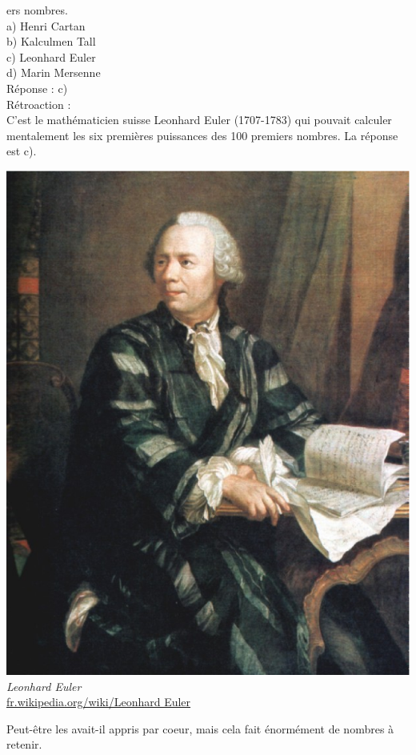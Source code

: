 \documentclass[letterpaper, 12pt]{article}
\begin{document}
ers nombres.\\

a) Henri Cartan\\
b) Kalculmen Tall\\
c) Leonhard Euler\\
d) Marin Mersenne\\

R\'eponse : c)\\

R\'etroaction :\\
C'est le math\'ematicien suisse Leonhard Euler (1707-1783) qui pouvait calculer mentalement les six premi\`eres puissances des 100 premiers nombres. La r\'eponse est c).
\begin{center}
\includegraphics[scale=0.15]{Euler.eps}\\
\emph{{\small Leonhard Euler}}\\
\href{http://fr.wikipedia.org/wiki/Leonhard_Euler}{fr.wikipedia.org/wiki/Leonhard Euler}\\
\end{center}
Peut-\^etre les avait-il appris par coeur, mais cela fait \'enorm\'ement de nombres \`a retenir.\\
\end{document}
